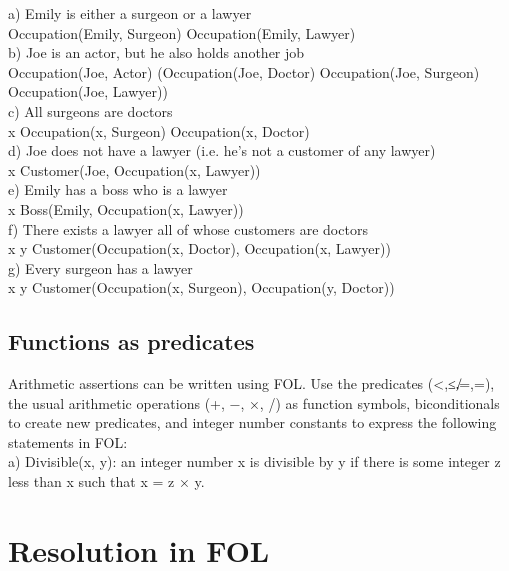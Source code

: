 \documentclass{article}
\begin{document}
a) Emily is either a surgeon or a lawyer\\
Occupation(Emily, \neg Surgeon) \wedge Occupation(Emily, \neg Lawyer)\\

b) Joe is an actor, but he also holds another job\\
Occupation(Joe, Actor) \wedge (Occupation(Joe, Doctor) \vee Occupation(Joe, Surgeon) \vee Occupation(Joe, Lawyer))\\

c) All surgeons are doctors\\
\forall x \: Occupation(x, Surgeon) \Rightarrow Occupation(x, Doctor)\\

d) Joe does not have a lawyer (i.e. he’s not a customer of any lawyer)\\
\exists x \: Customer(Joe, \neg Occupation(x, Lawyer))\\

e) Emily has a boss who is a lawyer\\
\exists x \: Boss(Emily, Occupation(x, Lawyer))\\

f) There exists a lawyer all of whose customers are doctors\\
\exists x \forall y \: Customer(Occupation(x, Doctor), Occupation(x, Lawyer))\\

g) Every surgeon has a lawyer\\
\forall x \exists y \: Customer(Occupation(x, Surgeon), Occupation(y, Doctor))\\


\subsection{Functions as predicates}

Arithmetic assertions can be written using FOL. Use the predicates (<,≤,̸=,=), the usual arithmetic operations (+, −, ×, /) as function symbols, biconditionals to create new predicates, and integer number constants to express the following statements in FOL:\\

a) Divisible(x, y): an integer number x is divisible by y if there is some integer z less than x such that x = z × y.\\

\section{Resolution in FOL}
\end{document}

